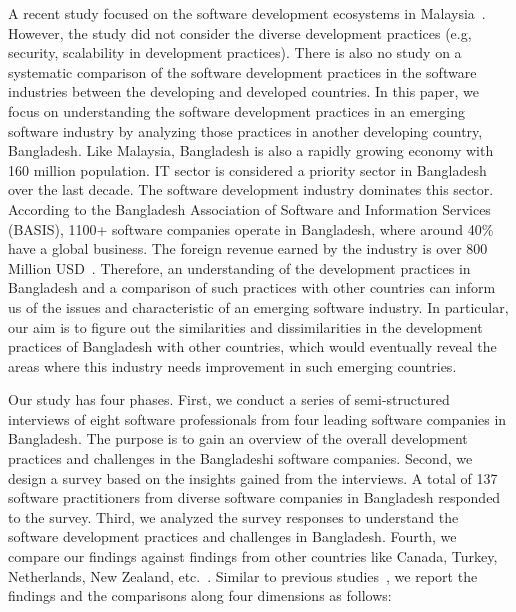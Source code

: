 A recent study 
focused on the software development ecosystems in Malaysia~\cite{Baharom2006}. However, the study 
did not consider the diverse development practices (e.g, security, scalability in development practices). There 
is also no study on a systematic comparison of the software development practices in the software industries 
between the developing and developed countries. In this paper, we focus on understanding the software development 
practices in an emerging software industry 
by analyzing those practices in another developing country, Bangladesh. Like Malaysia, 
Bangladesh is also a rapidly growing economy with 160 million
population. IT sector is considered a priority sector in Bangladesh over the
last decade. The software development industry dominates this sector. According to the
Bangladesh Association of Software and Information Services (BASIS), 1100+
software companies operate in Bangladesh, where around 40\% have a global
business. The foreign revenue earned by the industry is over 800 Million
USD~\cite{BASIS2018}. Therefore, an understanding of the development practices in Bangladesh and a comparison of such practices 
with other countries can inform us of the issues and characteristic of an emerging software industry.
In particular, our aim is to figure out the similarities and dissimilarities
in the development practices of Bangladesh with other countries, which would
eventually reveal the areas where this industry needs improvement in such emerging countries.
 
 
Our study has four phases. First, we conduct a series of semi-structured interviews of eight software professionals from four 
leading software companies in Bangladesh. The purpose is to gain an overview of the overall development practices and challenges 
in the Bangladeshi software companies. Second, we design a survey based on the insights gained from the interviews. A total of 137 
software practitioners from diverse software companies in Bangladesh responded to the survey. Third, 
we analyzed the survey responses to understand the software development practices and challenges in Bangladesh. Fourth, 
we compare our findings against findings from other countries like 
Canada, Turkey, Netherlands, New Zealand, etc.~\cite{Garousi2013, Garousi2015, Vonken2012, Wang2018}.   
Similar to previous studies~\cite{Garousi2013, Garousi2015, Vonken2012, Wang2018}, we report the findings and the comparisons along four dimensions as follows:

